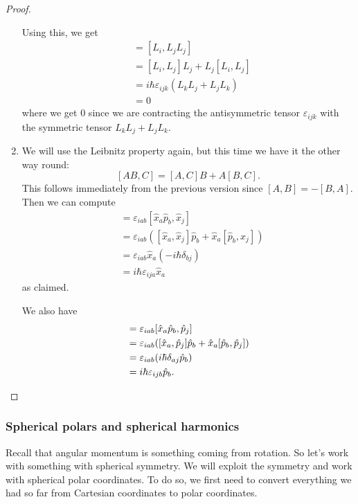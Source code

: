 \documentclass[a4paper]{article}
\begin{document}
\begin{proof}
\begin{enumerate}
      Using this, we get
      \begin{align*}
        [L_i, \mathbf{L}^2] &= [L_i, L_j L_j]\\
        &= [L_i, L_j] L_j + L_j [L_i, L_j]\\
        &= i\hbar \varepsilon_{ijk} (L_k L_j + L_j L_k)\\
        &= 0
      \end{align*}
      where we get $0$ since we are contracting the antisymmetric tensor $\varepsilon_{ijk}$ with the symmetric tensor $L_k L_j + L_j L_k$.
    \item We will use the Leibnitz property again, but this time we have it the other way round:
      \[
        [AB, C] = [A, C]B + A[B, C].
      \]
      This follows immediately from the previous version since $[A, B] = -[B, A]$. Then we can compute
      \begin{align*}
        [L_i, \hat{x}_j] &= \varepsilon_{iab} [\hat{x}_a \hat{p}_b, \hat{x}_j]\\
        &= \varepsilon_{iab} ([\hat{x}_a, \hat{x}_j] \hat{p}_b + \hat{x}_a [\hat{p}_b, \hat{x}_j])\\
        &= \varepsilon_{iab} \hat{x}_a (-i\hbar \delta_{bj})\\
        &= i\hbar \varepsilon_{ija} \hat{x}_a
      \end{align*}
      as claimed.

      We also have
      \begin{align*}
        [L_i, \hat{p}_j] &= \varepsilon_{iab} [\hat{x}_a \hat{p}_b, \hat{p}_j]\\
        &= \varepsilon_{iab} ([\hat{x}_a, \hat{p}_j] \hat{p}_b + \hat{x}_a [\hat{p}_b, \hat{p}_j])\\
        &= \varepsilon_{iab} (i\hbar \delta_{aj} \hat{p}_b)\\
        &= i\hbar \varepsilon_{ijb} \hat{p}_b.\qedhere
      \end{align*}%
  \end{enumerate}
\end{proof}
\subsubsection*{Spherical polars and spherical harmonics}
Recall that angular momentum is something coming from rotation. So let's work with something with spherical symmetry. We will exploit the symmetry and work with spherical polar coordinates. To do so, we first need to convert everything we had so far from Cartesian coordinates to polar coordinates.
\end{document}
